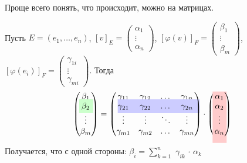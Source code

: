 \notice Проще всего понять, что происходит, можно на матрицах.

Пусть 
$E = (e_1, \dots, e_n)$,
$[v]_E = \begin{pmatrix}
\alpha_1 \\ 
\vdots \\ 
\alpha_n
\end{pmatrix}$, 
$[\varphi(v)]_F = \begin{pmatrix}
\beta_1 \\ 
\vdots \\ 
\beta_m
\end{pmatrix}$,
$[\varphi(e_i)]_F = \begin{pmatrix}
\gamma_{1i} \\ 
\vdots \\ 
\gamma_{mi}
\end{pmatrix}$. Тогда
$$
\begin{pmatrix}
    \beta_1 \\ 
    {
        \tikz[overlay]
        \fill[green!20] (-0.1,-0.2) rectangle (0.5,0.4);
    }
    \beta_2 \\ 
    \vdots \\ 
    \beta_m
\end{pmatrix}
=
\begin{pmatrix}
    \gamma_{11} & \gamma_{12} & \dots & \gamma_{1n} \\
    {
        \tikz[overlay]
        \fill[blue!20] (0,-0.2) rectangle (3.5,0.4);
    }
    \gamma_{21} & \gamma_{22} & \dots & \gamma_{2n} \\
    \vdots & \vdots & \ddots & \vdots \\
    \gamma_{m1} & \gamma_{m2} & \dots & \gamma_{mn} \\
\end{pmatrix}
\cdot
\begin{pmatrix}
    {
        \tikz[overlay]
        \fill[red!20] (-0.1,0.3) rectangle (0.5,-1.9);
    }
    \alpha_1 \\ 
    \alpha_2 \\ 
    \vdots \\ 
    \alpha_n
\end{pmatrix}
$$

Получается, что с одной стороны: 
\colorbox{green!20}{$\beta_i$}$= \sum \limits_{k=1}^{n}$ 
\colorbox{blue!20}{$\gamma_{ik}$}
$\cdot$
\colorbox{red!20}{$\alpha_k$}

